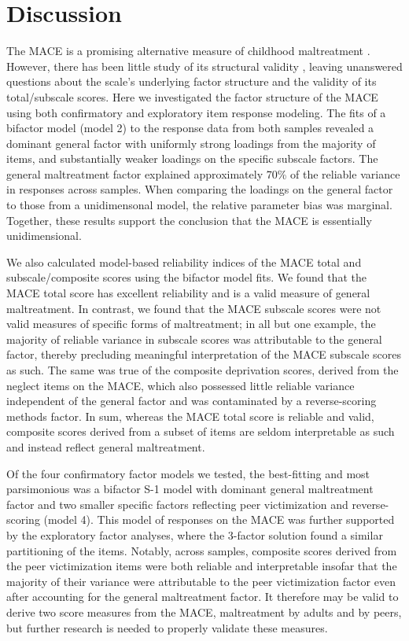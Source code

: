 \documentclass[letterpaper,man,natbib,floatsintext,longtable]{apa6}
\begin{document}
\section{Discussion}

The MACE is a promising alternative measure of childhood maltreatment \citep{georgieva2022systematic}. However, there has been little study of its structural validity \citep{saini2019systematic}, leaving unanswered questions about the scale's underlying factor structure and the validity of its total/subscale scores. Here we investigated the factor structure of the MACE using both confirmatory and exploratory item response modeling. The fits of a bifactor model (model 2) to the response data from both samples revealed a dominant general factor with uniformly strong loadings from the majority of items, and substantially weaker loadings on the specific subscale factors. The general maltreatment factor explained approximately 70\% of the reliable variance in responses across samples. When comparing the loadings on the general factor to those from a unidimensonal model, the relative parameter bias was marginal. Together, these results support the conclusion that the MACE is essentially unidimensional. 

We also calculated model-based reliability indices of the MACE total and subscale/composite scores using the bifactor model fits. We found that the MACE total score has excellent reliability and is a valid measure of general maltreatment. In contrast, we found that the MACE subscale scores were not valid measures of specific forms of maltreatment; in all but one example, the majority of reliable variance in subscale scores was attributable to the general factor, thereby precluding meaningful interpretation of the MACE subscale scores as such. The same was true of the composite deprivation scores, derived from the neglect items on the MACE, which also possessed little reliable variance independent of the general factor and was contaminated by a reverse-scoring methods factor. In sum, whereas the MACE total score is reliable and valid, composite scores derived from a subset of items are seldom interpretable as such and instead reflect general maltreatment.  

Of the four confirmatory factor models we tested, the best-fitting and most parsimonious was a bifactor S-1 model with dominant general maltreatment factor and two smaller specific factors reflecting peer victimization and reverse-scoring (model 4). This model of responses on the MACE was further supported by the exploratory factor analyses, where the 3-factor solution found a similar partitioning of the items. Notably, across samples, composite scores derived from the peer victimization items were both reliable and interpretable insofar that the majority of their variance were attributable to the peer victimization factor even after accounting for the general maltreatment factor. It therefore may be valid to derive two score measures from the MACE, maltreatment by adults and by peers, but further research is needed to properly validate these measures.
\end{document}
